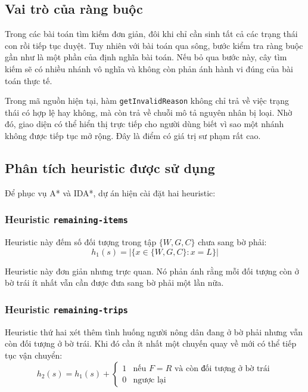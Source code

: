 \documentclass[a4paper,12pt]{article}
\begin{document}
\subsection{Vai trò của ràng buộc}

Trong các bài toán tìm kiếm đơn giản, đôi khi chỉ cần sinh tất cả các trạng thái con rồi tiếp tục duyệt. Tuy nhiên với bài toán qua sông, bước kiểm tra ràng buộc gần như là một phần của định nghĩa bài toán. Nếu bỏ qua bước này, cây tìm kiếm sẽ có nhiều nhánh vô nghĩa và không còn phản ánh hành vi đúng của bài toán thực tế.

Trong mã nguồn hiện tại, hàm \texttt{getInvalidReason} không chỉ trả về việc trạng thái có hợp lệ hay không, mà còn trả về chuỗi mô tả nguyên nhân bị loại. Nhờ đó, giao diện có thể hiển thị trực tiếp cho người dùng biết vì sao một nhánh không được tiếp tục mở rộng. Đây là điểm có giá trị sư phạm rất cao.

\subsection{Phân tích heuristic được sử dụng}

Để phục vụ A* và IDA*, dự án hiện cài đặt hai heuristic:

\subsubsection{Heuristic \texttt{remaining-items}}

Heuristic này đếm số đối tượng trong tập \(\{W, G, C\}\) chưa sang bờ phải:
\[
h_1(s) = |\{x \in \{W, G, C\} : x = L\}|
\]

Heuristic này đơn giản nhưng trực quan. Nó phản ánh rằng mỗi đối tượng còn ở bờ trái ít nhất vẫn cần được đưa sang bờ phải một lần nữa.

\subsubsection{Heuristic \texttt{remaining-trips}}

Heuristic thứ hai xét thêm tình huống người nông dân đang ở bờ phải nhưng vẫn còn đối tượng ở bờ trái. Khi đó cần ít nhất một chuyến quay về mới có thể tiếp tục vận chuyển:
\[
h_2(s) = h_1(s) +
\begin{cases}
1 & \text{nếu } F = R \text{ và còn đối tượng ở bờ trái} \\
0 & \text{ngược lại}
\end{cases}
\]
\end{document}
